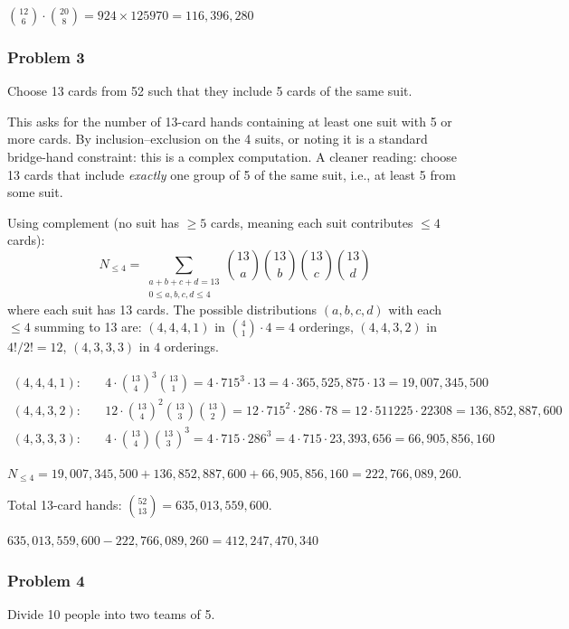 $\boxed{\binom{12}{6}\cdot\binom{20}{8} = 924 \times 125970 = 116{,}396{,}280}$

\subsubsection*{Problem 3}
Choose 13 cards from 52 such that they include 5 cards of the same suit.

This asks for the number of 13-card hands containing at least one suit with 5 or more cards. By inclusion--exclusion on the 4 suits, or noting it is a standard bridge-hand constraint: this is a complex computation. A cleaner reading: choose 13 cards that include \emph{exactly} one group of 5 of the same suit, i.e., at least 5 from some suit.

Using complement (no suit has $\ge 5$ cards, meaning each suit contributes $\le 4$ cards):
\[
N_{\le 4} = \sum_{\substack{a+b+c+d=13\\0\le a,b,c,d\le 4}} \binom{13}{a}\binom{13}{b}\binom{13}{c}\binom{13}{d}
\]
where each suit has 13 cards. The possible distributions $(a,b,c,d)$ with each $\le 4$ summing to 13 are: $(4,4,4,1)$ in $\binom{4}{1}\cdot 4 = 4$ orderings, $(4,4,3,2)$ in $4!/2!=12$, $(4,3,3,3)$ in $4$ orderings.

\begin{align*}
(4,4,4,1):&\quad 4\cdot\binom{13}{4}^3\binom{13}{1}= 4\cdot 715^3\cdot 13 = 4\cdot 365{,}525{,}875\cdot 13 = 19{,}007{,}345{,}500\\
(4,4,3,2):&\quad 12\cdot\binom{13}{4}^2\binom{13}{3}\binom{13}{2}=12\cdot 715^2\cdot 286\cdot 78 = 12\cdot 511225\cdot 22308 = 136{,}852{,}887{,}600\\[2pt]
(4,3,3,3):&\quad 4\cdot\binom{13}{4}\binom{13}{3}^3 = 4\cdot 715\cdot 286^3 = 4\cdot 715\cdot 23{,}393{,}656 = 66{,}905{,}856{,}160
\end{align*}

$N_{\le 4} = 19{,}007{,}345{,}500 + 136{,}852{,}887{,}600 + 66{,}905{,}856{,}160 = 222{,}766{,}089{,}260$.

Total 13-card hands: $\binom{52}{13} = 635{,}013{,}559{,}600$.

$\boxed{635{,}013{,}559{,}600 - 222{,}766{,}089{,}260 = 412{,}247{,}470{,}340}$

\subsubsection*{Problem 4}
Divide 10 people into two teams of 5.

